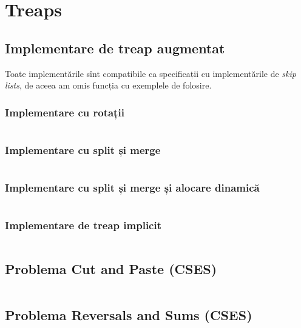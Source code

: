 \documentclass[../main.tex]{subfiles}
\begin{document}
\chapter{Treaps}

\section{Implementare de treap augmentat}
\label{code:treap}

Toate implementările sînt compatibile ca specificații cu implementările de \textit{skip lists}, de aceea am omis funcția  cu exemplele de folosire.

\subsection*{Implementare cu rotații}

\inputminted{cpp}{../src/advanced-ds/treap-rotations.cpp}

\subsection*{Implementare cu split și merge}

\inputminted{cpp}{../src/advanced-ds/treap-split-merge.cpp}

\subsection*{Implementare cu split și merge și alocare dinamică}

\inputminted{cpp}{../src/advanced-ds/treap-split-merge-dyn-alloc.cpp}

\subsection*{Implementare de treap implicit}

\inputminted{cpp}{../src/advanced-ds/treap-implicit.cpp}

\section{Problema Cut and Paste (CSES)}
\label{code:cut-and-paste}

\inputminted{cpp}{../src/advanced-ds/cut-and-paste.cpp}

\section{Problema Reversals and Sums (CSES)}
\label{code:reversals-and-sums}
\end{document}
